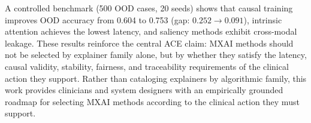 \documentclass[pdflatex,sn-mathphys-num]{sn-jnl}%
\theoremstyle{thmstyleone}%
\theoremstyle{thmstyletwo}%
\theoremstyle{thmstylethree}%
\begin{document}
{%
A controlled benchmark (500 OOD cases, 20 seeds) shows that causal training improves OOD accuracy from 0.604 to 0.753 (gap: $0.252 \to 0.091$), intrinsic attention achieves the lowest latency, and saliency methods exhibit cross-modal leakage. 
These results reinforce the central ACE claim: MXAI methods should not be selected by explainer family alone, but by whether they satisfy the latency, causal validity, stability, fairness, and traceability requirements of the clinical action they support.
Rather than cataloging explainers by algorithmic family, this work provides clinicians and system designers with an empirically grounded roadmap for selecting MXAI methods according to the clinical action they must support. 

}
\end{document}

